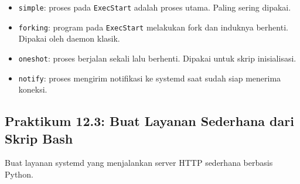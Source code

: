 \begin{itemize}
    \item \texttt{simple}: proses pada \texttt{ExecStart} adalah proses utama. Paling sering dipakai.
    \item \texttt{forking}: program pada \texttt{ExecStart} melakukan fork dan induknya berhenti. Dipakai oleh daemon klasik.
    \item \texttt{oneshot}: proses berjalan sekali lalu berhenti. Dipakai untuk skrip inisialisasi.
    \item \texttt{notify}: proses mengirim notifikasi ke systemd saat sudah siap menerima koneksi.
\end{itemize}

\subsection*{Praktikum 12.3: Buat Layanan Sederhana dari Skrip Bash}

Buat layanan systemd yang menjalankan server HTTP sederhana berbasis Python.

